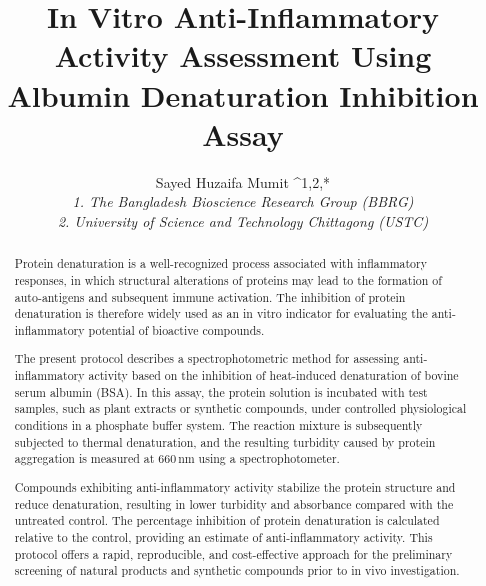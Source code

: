 \documentclass{comjnl}
\begin{document}
\title{In Vitro Anti-Inflammatory Activity Assessment Using Albumin Denaturation Inhibition Assay}
\author{Sayed Huzaifa Mumit ^{1,2,*} \\ 
\textit{1. The Bangladesh Bioscience Research Group (BBRG)} \\
\textit{2. University of Science and Technology Chittagong (USTC)} }







\begin{abstract}
Protein denaturation is a well-recognized process associated with inflammatory responses, in which structural alterations of proteins may lead to the formation of auto-antigens and subsequent immune activation. The inhibition of protein denaturation is therefore widely used as an in vitro indicator for evaluating the anti-inflammatory potential of bioactive compounds. 

The present protocol describes a spectrophotometric method for assessing anti-inflammatory activity based on the inhibition of heat-induced denaturation of bovine serum albumin (BSA). In this assay, the protein solution is incubated with test samples, such as plant extracts or synthetic compounds, under controlled physiological conditions in a phosphate buffer system. The reaction mixture is subsequently subjected to thermal denaturation, and the resulting turbidity caused by protein aggregation is measured at 660\,nm using a spectrophotometer. 

Compounds exhibiting anti-inflammatory activity stabilize the protein structure and reduce denaturation, resulting in lower turbidity and absorbance compared with the untreated control. The percentage inhibition of protein denaturation is calculated relative to the control, providing an estimate of anti-inflammatory activity. This protocol offers a rapid, reproducible, and cost-effective approach for the preliminary screening of natural products and synthetic compounds prior to in vivo investigation.

\end{abstract}
\end{document}
